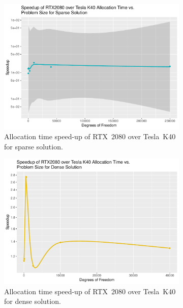 \begin{figure}
	\centering
	\begin{subfigure}{0.48\linewidth}
		\centering
		\includegraphics[width = \linewidth]{Plots/alloc_sparse_rtx_speedup_vs_n}
		\caption{Allocation time speed-up of RTX~2080 over Tesla~K40 for sparse solution.}
		\label{fig:alloc_rtx_sparse}
	\end{subfigure}\hfill
	\begin{subfigure}{0.48\linewidth}
		\centering
		\includegraphics[width=\linewidth]{Plots/alloc_dense_rtx_speedup_vs_n}
		\caption{Allocation time speed-up of RTX~2080 over Tesla~K40 for dense solution.}
		\label{fig:alloc_rtx_dense}
	\end{subfigure}\\
	\begin{subfigure}{0.48\linewidth}

\end{subfigure}
\end{figure}
